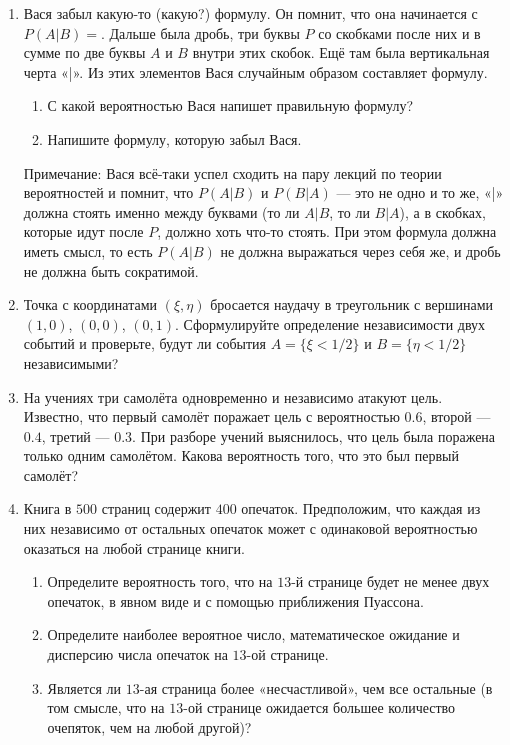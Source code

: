 \documentclass[12pt, a4paper]{article}\usepackage[]{graphicx}\usepackage[]{color}
\begin{document}
\begin{enumerate}



\item Вася забыл какую-то (какую?) формулу. Он помнит, что она начинается с $P(A|B)=$. Дальше была дробь, три буквы $P$ со скобками после них и в сумме по две буквы $A$ и $B$ внутри этих скобок. Ещё там была вертикальная черта «|». Из этих элементов Вася случайным образом составляет формулу.
\begin{enumerate}
\item С какой вероятностью Вася напишет правильную формулу?
\item Напишите формулу, которую забыл Вася.
\end{enumerate}

Примечание: Вася всё-таки успел сходить на пару лекций по теории вероятностей и помнит, что $P(A|B)$ и $P(B|A)$ — это не одно и то же, «|» должна стоять именно между буквами (то ли $A|B$, то ли $B|A$), а в скобках, которые идут после $P$, должно хоть что-то стоять. При этом формула должна иметь смысл, то есть  $P(A|B)$   не должна выражаться через себя же, и дробь не должна быть сократимой.

\item Точка с координатами $(\xi, \eta)$ бросается наудачу в треугольник с вершинами $(1,0)$, $(0,0)$, $(0,1)$.  Сформулируйте определение независимости двух событий и проверьте, будут ли события $A=\{ \xi < 1/2 \}$  и $B=\{ \eta < 1/2 \}$  независимыми?

\item На учениях три самолёта одновременно и независимо атакуют цель. Известно, что первый самолёт поражает цель с вероятностью $0.6$, второй — $0.4$, третий — $0.3$. При разборе учений выяснилось, что цель была поражена только одним самолётом. Какова вероятность того, что это был первый самолёт?

\item Книга в $500$ страниц содержит $400$ опечаток. Предположим, что каждая из них независимо от остальных опечаток может с одинаковой вероятностью оказаться на любой странице книги.
\begin{enumerate}

\item Определите вероятность того, что на $13$-й странице будет не менее двух опечаток, в явном виде и с помощью приближения Пуассона.
\item Определите наиболее вероятное число, математическое ожидание и дисперсию числа опечаток на $13$-ой странице.
\item Является ли $13$-ая страница более «несчастливой», чем все остальные (в том смысле, что на $13$-ой странице ожидается большее количество очепяток, чем на любой другой)?
\end{enumerate}


\end{enumerate}
\end{document}
